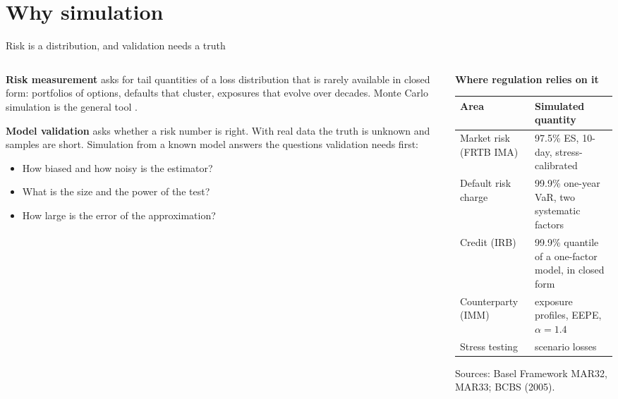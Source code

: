 \section{Why simulation}

\begin{frame}{Risk is a distribution, and validation needs a truth}
  \small
  \begin{columns}[T]
    \begin{column}{0.5\textwidth}
      \textbf{Risk measurement} asks for tail quantities of a loss distribution that is rarely available in closed form: portfolios of options, defaults that cluster, exposures that evolve over decades. Monte Carlo simulation is the general tool \citep{glasserman2003monte}.
      \vspace{0.4em}

      \textbf{Model validation} asks whether a risk number is right. With real data the truth is unknown and samples are short. Simulation from a known model answers the questions validation needs first:
      \begin{itemize}
        \item How biased and how noisy is the estimator?
        \item What is the size and the power of the test?
        \item How large is the error of the approximation?
      \end{itemize}
    \end{column}
    \begin{column}{0.46\textwidth}
      \textbf{Where regulation relies on it}
      \vspace{0.2em}

      \footnotesize
      \begin{tabular}{L{0.36\textwidth}L{0.5\textwidth}}
        \toprule
        Area & Simulated quantity \\
        \midrule
        Market risk (FRTB IMA) & 97.5\% ES, 10-day, stress-calibrated \\
        Default risk charge & 99.9\% one-year VaR, two systematic factors \\
        Credit (IRB) & 99.9\% quantile of a one-factor model, in closed form \\
        Counterparty (IMM) & exposure profiles, EEPE, $\alpha = 1.4$ \\
        Stress testing & scenario losses \\
        \bottomrule
      \end{tabular}
      \vspace{0.3em}

      \small Sources: Basel Framework MAR32, MAR33; BCBS (2005).
    \end{column}
  \end{columns}
\end{frame}

